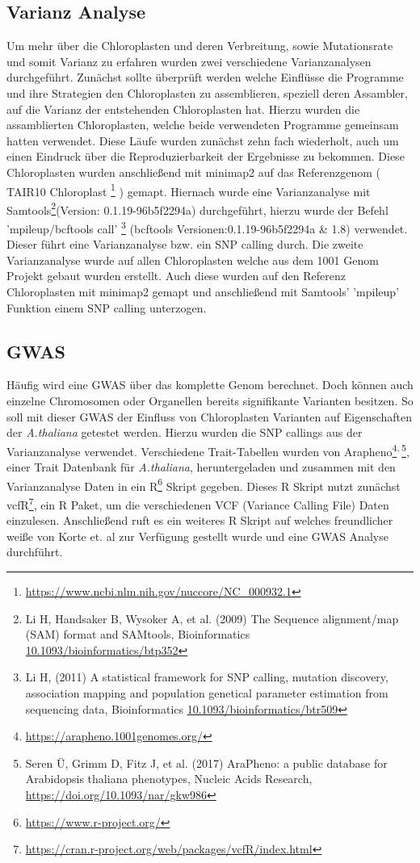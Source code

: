 \documentclass{scrartcl}
\begin{document}
\subsection{Varianz Analyse}
\label{sec-3-2}
Um mehr über die Chloroplasten und deren Verbreitung, sowie Mutationsrate und somit Varianz zu erfahren wurden zwei verschiedene Varianzanalysen durchgeführt. 
Zunächst sollte überprüft werden welche Einflüsse die Programme und ihre Strategien den Chloroplasten zu assemblieren, speziell deren Assambler, auf die Varianz der 
entstehenden Chloroplasten hat. Hierzu wurden die assamblierten Chloroplasten, welche beide verwendeten Programme gemeinsam hatten verwendet. Diese Läufe wurden zunächst
zehn fach wiederholt, auch um einen Eindruck über die Reproduzierbarkeit der Ergebnisse zu bekommen. Diese Chloroplasten wurden anschließend mit minimap2 \footnotemark[50]{} auf das 
Referenzgenom ( TAIR10 Chloroplast \footnote{\url{https://www.ncbi.nlm.nih.gov/nuccore/NC_000932.1}} ) gemapt. Hiernach wurde eine Varianzanalyse mit Samtools\footnote{Li H, Handsaker B, Wysoker A, et al. (2009) The Sequence alignment/map (SAM) format and SAMtools, Bioinformatics \url{10.1093/bioinformatics/btp352}}(Version: 0.1.19-96b5f2294a) durchgeführt, hierzu wurde der Befehl
'mpileup/bcftools call' \footnote{Li H, (2011) A statistical framework for SNP calling, mutation discovery, association mapping and population genetical parameter estimation from sequencing data, Bioinformatics  \url{10.1093/bioinformatics/btr509}} (bcftools Versionen:0.1.19-96b5f2294a \& 1.8) verwendet. Dieser führt eine Varianzanalyse bzw. ein SNP calling durch. Die zweite Varianzanalyse wurde auf allen Chloroplasten welche aus dem
1001 Genom Projekt gebaut wurden erstellt. Auch diese wurden auf den Referenz Chloroplasten mit minimap2 gemapt und anschließend mit Samtools' 'mpileup' Funktion einem
SNP calling unterzogen. 

\subsection{GWAS}
\label{sec-3-3}
Häufig wird eine GWAS über das komplette Genom berechnet. Doch können auch einzelne Chromosomen oder Organellen bereits signifikante Varianten besitzen. 
So soll mit dieser GWAS der Einfluss von Chloroplasten Varianten auf Eigenschaften der \emph{A.thaliana} getestet werden. Hierzu wurden die SNP callings aus der Varianzanalyse verwendet.
Verschiedene Trait-Tabellen wurden von Arapheno\footnote{\url{https://arapheno.1001genomes.org/}}\textsuperscript{,}\,\footnote{Seren Ü, Grimm D, Fitz J, et al. (2017) AraPheno: a public database for Arabidopsis thaliana phenotypes, Nucleic Acids Research, \url{https://doi.org/10.1093/nar/gkw986}}, einer Trait Datenbank für \emph{A.thaliana}, heruntergeladen und zusammen mit den Varianzanalyse Daten in ein R\footnote{\url{https://www.r-project.org/}} Skript gegeben.
Dieses R Skript nutzt zunächst vcfR\footnote{\url{https://cran.r-project.org/web/packages/vcfR/index.html}}, ein R Paket, um die verschiedenen VCF (Variance Calling File) Daten einzulesen. Anschließend ruft es ein weiteres R Skript auf welches
freundlicher weiße von Korte et. al\footnotemark[43]{} zur Verfügung gestellt wurde und eine GWAS Analyse durchführt.
\end{document}
